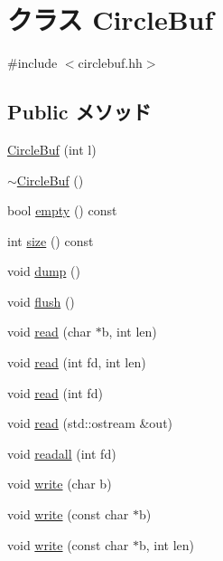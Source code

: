 \hypertarget{classCircleBuf}{
\section{クラス CircleBuf}
\label{classCircleBuf}
}


{\ttfamily \#include $<$circlebuf.hh$>$}\subsection*{Public メソッド}
\begin{DoxyCompactItemize}
\item 
\hyperlink{classCircleBuf_af891350dcd605da7c72c31ef7f5d6fa8}{CircleBuf} (int l)
\item 
\hyperlink{classCircleBuf_a4b75d682afe5fefd7d4333f411379e20}{$\sim$CircleBuf} ()
\item 
bool \hyperlink{classCircleBuf_ac6e61de369e994009e36f344f99c15ad}{empty} () const 
\item 
int \hyperlink{classCircleBuf_ab8e4e3e2a7bf18888b71bdf9dda0770b}{size} () const 
\item 
void \hyperlink{classCircleBuf_accd2600060dbaee3a3b41aed4034c63c}{dump} ()
\item 
void \hyperlink{classCircleBuf_adac116554b543b7c4228c018a85882f5}{flush} ()
\item 
void \hyperlink{classCircleBuf_a208ffb7fc988270a34244c2004d9a6e2}{read} (char $\ast$b, int len)
\item 
void \hyperlink{classCircleBuf_a456a2875e76e14ea14f598f248506f21}{read} (int fd, int len)
\item 
void \hyperlink{classCircleBuf_a7d3756c26077c588c877e36f8b3c94af}{read} (int fd)
\item 
void \hyperlink{classCircleBuf_affdc602556fb4fb51bfa307d5aa4f956}{read} (std::ostream \&out)
\item 
void \hyperlink{classCircleBuf_a3c78951b2792a613e4cff9194ced196c}{readall} (int fd)
\item 
void \hyperlink{classCircleBuf_a03ed9bf9f1a85f8085db042491f62b1d}{write} (char b)
\item 
void \hyperlink{classCircleBuf_adeb1ea40a2a10d78a2143225d4c8045b}{write} (const char $\ast$b)
\item 
void \hyperlink{classCircleBuf_a4dc60fcb37e3faf4658e301baf4a2be8}{write} (const char $\ast$b, int len)
\end{DoxyCompactItemize}

